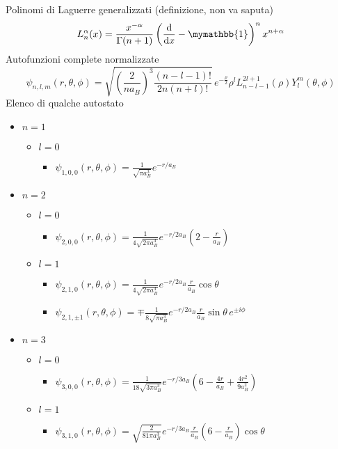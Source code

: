 \documentclass{article}
\newcommand{\deh}{\mathrm{d}}
\newcommand{\dsone}{\mymathbb{1}}
\newcommand{\der}[2][1]{\if 1#1 \frac{\deh}{\deh #2} \else \frac{\deh^#1}{\deh #2^#1} \fi}
\begin{document}
Polinomi di Laguerre generalizzati (definizione, non va saputa)
\[L_n^\alpha(x)=\frac{x^{-\alpha}}{\Gamma(n+1)}\left(\der{x} -\dsone\right)^n x^{n+\alpha}\]
Autofunzioni complete normalizzate
\[\psi_{n,l,m}(r,\theta,\phi)=\sqrt{\left(\frac{2}{na_B}\right)^3\frac{(n-l-1)!}{2n(n+l)!}}\,e^{-\frac{\rho}{2}}\rho^l L_{n-l-1}^{2l+1}(\rho)Y_l^m(\theta,\phi)\]
Elenco di qualche autostato
\begin{itemize}
    \item $n=1$
    \begin{itemize}
        \item $l=0$
        \begin{itemize}
            \item[] $\psi_{1,0,0}(r,\theta,\phi)=\frac{1}{\sqrt{\pi a_B^3}}e^{-r/a_B}$ 
        \end{itemize}
    \end{itemize}
    \item $n=2$
    \begin{itemize}
        \item $l=0$
        \begin{itemize}
            \item[] $\psi_{2,0,0}(r,\theta,\phi)=\frac{1}{4\sqrt{2\pi a_B^3}}e^{-r/2a_B}\left(2-\frac{r}{a_B}\right)$ 
        \end{itemize}
        \item $l=1$
        \begin{itemize}
            \item[] $\psi_{2,1,0}(r,\theta,\phi)=\frac{1}{4\sqrt{2\pi a_B^3}}e^{-r/2a_B}\frac{r}{a_B}\cos\theta$
            \item[] $\psi_{2,1,\pm1}(r,\theta,\phi)=\mp \frac{1}{8\sqrt{\pi a_B^3}}e^{-r/2a_B}\frac{r}{a_B}\sin\theta \,e^{\pm i \phi}$ 
        \end{itemize}
    \end{itemize}
    \item $n=3$
    \begin{itemize}
        \item $l=0$
        \begin{itemize}
            \item[] $\psi_{3,0,0}(r,\theta,\phi)=\frac{1}{18\sqrt{3\pi a_B^3}}e^{-r/3a_B}\left(6-\frac{4r}{a_B}+\frac{4r^2}{9a_B^2}\right)$ 
        \end{itemize}
        \item $l=1$
        \begin{itemize}
            \item[] $\psi_{3,1,0}(r,\theta,\phi)=\sqrt{\frac{2}{81\pi a_B^3}}e^{-r/3a_B}\frac{r}{a_B}\left(6-\frac{r}{a_B}\right)\cos\theta$

\end{itemize}
\end{itemize}
\end{itemize}
\end{document}
